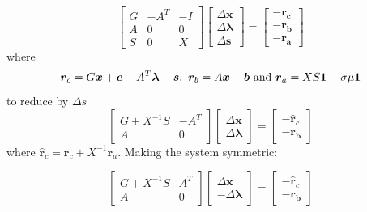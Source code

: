 \documentclass[12pt,a4paper,twoside]{report}
\begin{document}
{\begin{equation}
	\begin{bmatrix}
	G &-A^T & -I\\
	A & 0 & 0 \\
	S & 0  & X
	\end{bmatrix} 
	\begin{bmatrix}
	\Delta\boldsymbol{x} \\ \Delta\boldsymbol{\lambda} \\ \Delta\boldsymbol{s}
	\end{bmatrix} =
		\begin{bmatrix}
		\boldsymbol{-r_c} \\ \boldsymbol{-r_b} \\ \boldsymbol{-r_a}
		\end{bmatrix}
\end{equation}
where 
\begin{equation}
\boldsymbol{r}_c = G\boldsymbol{x} + \boldsymbol{c}-A^T\boldsymbol{\lambda} - \boldsymbol{s}, \ 
\boldsymbol{r}_b = A\boldsymbol{x}-\boldsymbol{b} \ \textnormal{and} \ 
\boldsymbol{r}_a = XS\boldsymbol{1}- \sigma\mu \boldsymbol{1}
\end{equation}
to reduce by $\Delta s$
\begin{equation}
	\begin{bmatrix}
	G+X^{-1}S &-A^T \\
	A & 0  
	\end{bmatrix} 
	\begin{bmatrix}
	\Delta\boldsymbol{x} \\ \Delta\boldsymbol{\lambda} 
	\end{bmatrix} =
	\begin{bmatrix}
	-\hat{\boldsymbol{r}}_c \\ \boldsymbol{-r_b} 
	\end{bmatrix}
\end{equation}
where $\hat{\boldsymbol{r}}_c = \boldsymbol{r}_c + X^{-1}\boldsymbol{r}_a$. Making the system symmetric:


\begin{equation}
\begin{bmatrix}
G+X^{-1}S &A^T \\
A & 0  
\end{bmatrix} 
\begin{bmatrix}
\Delta\boldsymbol{x} \\ -\Delta\boldsymbol{\lambda} 
\end{bmatrix} =
\begin{bmatrix}
-\hat{\boldsymbol{r}}_c \\ \boldsymbol{-r_b} 
\end{bmatrix}
\end{equation}

}
\end{document}

